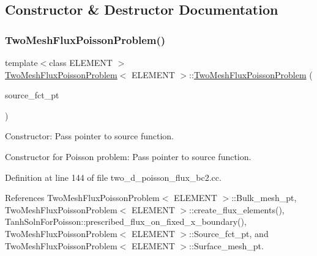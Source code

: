 \subsection{Constructor \& Destructor Documentation}
\mbox{\label{classTwoMeshFluxPoissonProblem_ace5a47aa61da5fd2a8761a16ffb3711c}} 
\subsubsection{\texorpdfstring{Two\+Mesh\+Flux\+Poisson\+Problem()}{TwoMeshFluxPoissonProblem()}}
{\footnotesize\ttfamily template$<$class E\+L\+E\+M\+E\+NT $>$ \\
\hyperlink{classTwoMeshFluxPoissonProblem}{Two\+Mesh\+Flux\+Poisson\+Problem}$<$ E\+L\+E\+M\+E\+NT $>$\+::\hyperlink{classTwoMeshFluxPoissonProblem}{Two\+Mesh\+Flux\+Poisson\+Problem} (\begin{DoxyParamCaption}\item[{Poisson\+Equations$<$ 2 $>$\+::Poisson\+Source\+Fct\+Pt}]{source\+\_\+fct\+\_\+pt }\end{DoxyParamCaption})}



Constructor\+: Pass pointer to source function. 

Constructor for Poisson problem\+: Pass pointer to source function. 

Definition at line 144 of file two\+\_\+d\+\_\+poisson\+\_\+flux\+\_\+bc2.\+cc.



References Two\+Mesh\+Flux\+Poisson\+Problem$<$ E\+L\+E\+M\+E\+N\+T $>$\+::\+Bulk\+\_\+mesh\+\_\+pt, Two\+Mesh\+Flux\+Poisson\+Problem$<$ E\+L\+E\+M\+E\+N\+T $>$\+::create\+\_\+flux\+\_\+elements(), Tanh\+Soln\+For\+Poisson\+::prescribed\+\_\+flux\+\_\+on\+\_\+fixed\+\_\+x\+\_\+boundary(), Two\+Mesh\+Flux\+Poisson\+Problem$<$ E\+L\+E\+M\+E\+N\+T $>$\+::\+Source\+\_\+fct\+\_\+pt, and Two\+Mesh\+Flux\+Poisson\+Problem$<$ E\+L\+E\+M\+E\+N\+T $>$\+::\+Surface\+\_\+mesh\+\_\+pt.

\mbox{\label{classTwoMeshFluxPoissonProblem_a03e83ef12db3bf5a1e015c3c3b11337c}} 
